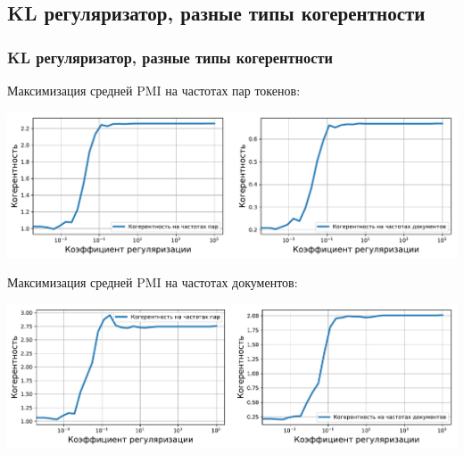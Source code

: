 \documentclass[unicode]{beamer}
\begin{document}
\subsection{KL регуляризатор, разные типы когерентности}
\begin{frame}
\frametitle{KL регуляризатор, разные типы когерентности}
Максимизация средней PMI на частотах пар токенов:
\begin{center}
    \includegraphics[scale=0.30]{coherence_tf_reg_on_ppmi_nytimes.pdf}
\end{center}

Максимизация средней PMI на частотах документов:
\begin{center}
    \includegraphics[scale=0.30]{coherence_df_reg_on_ppmi_nytimes.pdf}
\end{center}
\end{frame}
\end{document}
